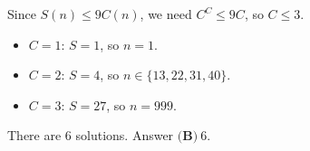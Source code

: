 Since $S(n)\le9C(n)$, we need $C^C\le9C$, so $C\le3$.
\begin{itemize}
\item $C=1$: $S=1$, so $n=1$.
\item $C=2$: $S=4$, so $n\in\{13,22,31,40\}$.
\item $C=3$: $S=27$, so $n=999$.
\end{itemize}
There are $6$ solutions. Answer $\boxed{\textbf{(B)}\ 6}$.
